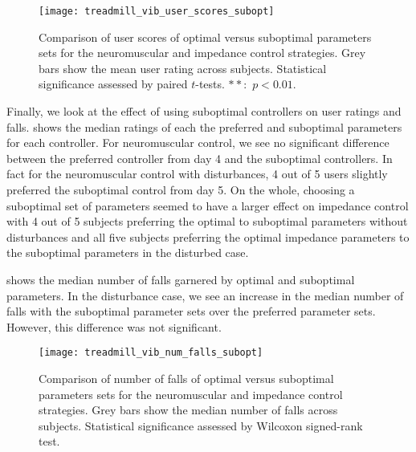 \begin{figure}[t]
    \centering 
    \texttt{[image: treadmill\_vib\_user\_scores\_subopt]}
    \caption[Comparison of user scores of optimal versus suboptimal parameters
    sets]{Comparison of user scores of optimal versus suboptimal parameters sets
    for the neuromuscular and impedance control strategies. Grey bars show the
    mean user rating across subjects. Statistical significance assessed by
    paired $t$-tests. $**$:~$p <
    0.01$.}\label{fig:treadmill_exp_user_ratings_subopt}
\end{figure}
Finally, we look at the effect of using suboptimal controllers on user ratings
and falls.  shows the median ratings of
each the preferred and suboptimal parameters for each controller. For
neuromuscular control, we see no significant difference between the preferred
controller from day 4 and the suboptimal controllers. In fact for the
neuromuscular control with disturbances, 4 out of 5 users slightly preferred the
suboptimal control from day 5. On the whole, choosing a suboptimal set of
parameters seemed to have a larger effect on impedance control with 4 out of 5
subjects preferring the optimal to suboptimal parameters without disturbances
and all five subjects preferring the optimal impedance parameters to the
suboptimal parameters in the disturbed case.

 shows the median number of falls
garnered by optimal and suboptimal parameters. In the disturbance case, we see
an increase in the median number of falls with the suboptimal parameter sets
over the preferred parameter sets. However, this difference was not significant.

\begin{figure}[b]
    \centering 
    \texttt{[image: treadmill\_vib\_num\_falls\_subopt]}
    \caption[Comparison of number of falls of optimal versus suboptimal
    parameters sets]{Comparison of number of falls of optimal versus suboptimal
    parameters sets for the neuromuscular and impedance control strategies. Grey
    bars show the median number of falls across subjects. Statistical
    significance assessed by Wilcoxon signed-rank
    test.}\label{fig:treadmill_exp_num_falls_subopt}
\end{figure}
